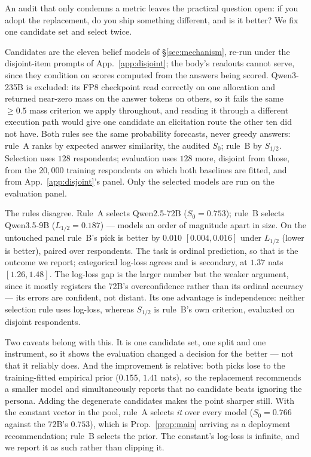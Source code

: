 \documentclass[11pt]{article}
\begin{document}
An audit that only condemns a metric leaves the practical question open: if
you adopt the replacement, do you ship something different, and is it better?
We fix one candidate set and select twice.

Candidates are the eleven belief models of \S\ref{sec:mechanism}, re-run under
the disjoint-item prompts of App.~\ref{app:disjoint}; the body's readouts
cannot serve, since they condition on scores computed from the answers being
scored. Qwen3-235B is excluded: its FP8 checkpoint read correctly on one
allocation and returned near-zero mass on the answer tokens on others, so it
fails the same $\ge 0.5$ mass criterion we apply throughout, and reading it
through a different execution path would give one candidate an elicitation
route the other ten did not have. Both rules see the same probability
forecasts, never greedy answers: rule~A ranks by expected answer similarity,
the audited $S_0$; rule~B by $S_{1/2}$. Selection uses $128$ respondents;
evaluation uses $128$ more, disjoint from those, from the $20{,}000$ training
respondents on which both baselines are fitted, and from App.~\ref{app:disjoint}'s
panel. Only the selected models are run on the evaluation panel.

The rules disagree. Rule~A selects Qwen2.5-72B ($S_0=0.753$); rule~B selects
Qwen3.5-9B ($L_{1/2}=0.187$) --- models an order of magnitude apart in size. On
the untouched panel rule~B's pick is better by $0.010$ $[0.004,0.016]$ under
$L_{1/2}$ (lower is better), paired over respondents. The task is ordinal prediction, so that is
the outcome we report; categorical log-loss agrees and is secondary, at $1.37$
nats $[1.26,1.48]$. The log-loss gap is the larger number but the weaker
argument, since it mostly registers the 72B's overconfidence rather than its
ordinal accuracy --- its errors are confident, not distant. Its one advantage
is independence: neither selection rule uses log-loss, whereas $S_{1/2}$ is
rule~B's own criterion, evaluated on disjoint respondents.

Two caveats belong with this. It is one candidate set, one split and one
instrument, so it shows the evaluation changed a decision for the better ---
not that it reliably does. And the improvement is relative: both picks lose to
the training-fitted empirical prior ($0.155$, $1.41$ nats), so the replacement
recommends a smaller model and simultaneously reports that no candidate beats
ignoring the persona. Adding the degenerate candidates makes the point sharper
still. With the constant vector in the pool, rule~A selects \emph{it} over
every model ($S_0=0.766$ against the 72B's $0.753$), which is
Prop.~\ref{prop:main} arriving as a deployment recommendation; rule~B
selects the prior. The constant's log-loss is infinite, and we report it as
such rather than clipping it.
\end{document}
